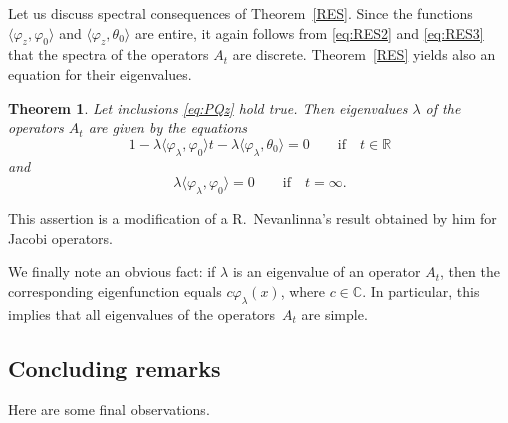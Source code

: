 \documentclass[pdftex]{sigma}%
\numberwithin{equation}{section}
\newtheorem{Theorem}{Theorem}[section]
\begin{document}
 Let us discuss spectral consequences of Theorem~\ref{RES}. Since the functions $ \langle \varphi_{z}, \varphi_{0}\rangle $ and $ \langle \varphi_{z}, \theta_{0}\rangle $ are entire, it again follows from \eqref{eq:RES2} and \eqref{eq:RES3} that the spectra of the operators $A_{t}$ are discrete. Theorem~\ref{RES} yields also an equation for their eigenvalues.

 \begin{Theorem}\label{RESp}
 Let inclusions \eqref{eq:PQz} hold true.
 Then eigenvalues $\lambda $ of the operators $A_{t}$ are given by the equations
 \begin{equation}
 1 - \lambda \langle \varphi_{\lambda}, \varphi_{0}\rangle t - \lambda \langle \varphi_{\lambda}, \theta_{0}\rangle =0 \qquad \mbox{if}\quad t\in {\mathbb R}
 \label{eq:RESp2}\end{equation}
 and
 \begin{equation}
\lambda \langle \varphi_{\lambda}, \varphi_{0}\rangle =0 \qquad \mbox{if} \quad t=\infty.
 \label{eq:RES3p}\end{equation}
 \end{Theorem}

 This assertion is a modification of a R.~Nevanlinna's result obtained by him for Jacobi ope\-rators.

 We finally note an obvious fact: if $\lambda $ is an eigenvalue of an operator $A_{t}$, then the corresponding eigenfunction equals $c\varphi_{\lambda} (x)$, where $c\in{\mathbb C}$. In particular, this implies that all eigenvalues of the operators~$A_{t}$ are simple.

\subsection{Concluding remarks}\label{section3.4}

Here are some final observations.
\end{document}
